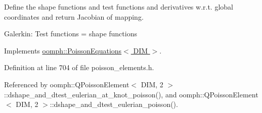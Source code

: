 Define the shape functions and test functions and derivatives w.\+r.\+t. global coordinates and return Jacobian of mapping.

Galerkin\+: Test functions = shape functions 

Implements \hyperlink{classoomph_1_1PoissonEquations_af68ad067d9a9d1bcbcc1ee3094b77a7a}{oomph\+::\+Poisson\+Equations$<$ D\+I\+M $>$}.



Definition at line 704 of file poisson\+\_\+elements.\+h.



Referenced by oomph\+::\+Q\+Poisson\+Element$<$ D\+I\+M, 2 $>$\+::dshape\+\_\+and\+\_\+dtest\+\_\+eulerian\+\_\+at\+\_\+knot\+\_\+poisson(), and oomph\+::\+Q\+Poisson\+Element$<$ D\+I\+M, 2 $>$\+::dshape\+\_\+and\+\_\+dtest\+\_\+eulerian\+\_\+poisson().

\mbox{\label{classoomph_1_1QPoissonElement_a0e919ee36672fdf05dedad29d8e53b8a}} 
